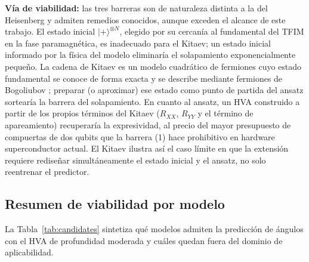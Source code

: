 \documentclass[11pt,a4paper,spanish]{book}
\begin{document}
\textbf{Vía de viabilidad:} las tres barreras son de naturaleza distinta a la del Heisenberg y admiten remedios conocidos, aunque exceden el alcance de este trabajo. El estado inicial $|+\rangle^{\otimes N}$, elegido por su cercanía al fundamental del TFIM en la fase paramagnética, es inadecuado para el Kitaev; un estado inicial informado por la física del modelo eliminaría el solapamiento exponencialmente pequeño. La cadena de Kitaev es un modelo cuadrático de fermiones cuyo estado fundamental se conoce de forma exacta y se describe mediante fermiones de Bogoliubov \citep{kitaev2001}; preparar (o aproximar) ese estado como punto de partida del ansatz sortearía la barrera del solapamiento. En cuanto al ansatz, un HVA construido a partir de los propios términos del Kitaev ($R_{XX}$, $R_{YY}$ y el término de apareamiento) recuperaría la expresividad, al precio del mayor presupuesto de compuertas de dos qubits que la barrera (1) hace prohibitivo en hardware superconductor actual. El Kitaev ilustra así el caso límite en que la extensión requiere rediseñar simultáneamente el estado inicial y el ansatz, no solo reentrenar el predictor.

\subsection{Resumen de viabilidad por modelo}

La Tabla~\ref{tab:candidates} sintetiza qué modelos admiten la predicción de ángulos con el HVA de profundidad moderada y cuáles quedan fuera del dominio de aplicabilidad.
\end{document}
